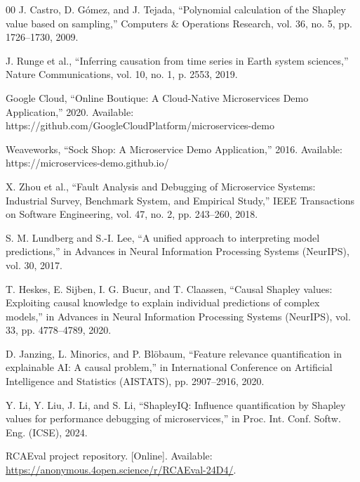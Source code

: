 \documentclass[conference]{IEEEtran}
\begin{document}
\begin{thebibliography}{00}
J. Castro, D. G\'{o}mez, and J. Tejada, ``Polynomial calculation of the Shapley value based on sampling,'' Computers \& Operations Research, vol. 36, no. 5, pp. 1726--1730, 2009.

J. Runge et al., ``Inferring causation from time series in Earth system sciences,'' Nature Communications, vol. 10, no. 1, p. 2553, 2019.

Google Cloud, ``Online Boutique: A Cloud-Native Microservices Demo Application,'' 2020. Available: https://github.com/GoogleCloudPlatform/microservices-demo

Weaveworks, ``Sock Shop: A Microservice Demo Application,'' 2016. Available: https://microservices-demo.github.io/

X. Zhou et al., ``Fault Analysis and Debugging of Microservice Systems: Industrial Survey, Benchmark System, and Empirical Study,'' IEEE Transactions on Software Engineering, vol. 47, no. 2, pp. 243--260, 2018.

S. M. Lundberg and S.-I. Lee, ``A unified approach to interpreting model predictions,'' in Advances in Neural Information Processing Systems (NeurIPS), vol. 30, 2017.

T. Heskes, E. Sijben, I. G. Bucur, and T. Claassen, ``Causal Shapley values: Exploiting causal knowledge to explain individual predictions of complex models,'' in Advances in Neural Information Processing Systems (NeurIPS), vol. 33, pp. 4778--4789, 2020.

D. Janzing, L. Minorics, and P. Blöbaum, ``Feature relevance quantification in explainable AI: A causal problem,'' in International Conference on Artificial Intelligence and Statistics (AISTATS), pp. 2907--2916, 2020.

Y. Li, Y. Liu, J. Li, and S. Li, ``ShapleyIQ: Influence quantification by Shapley values for performance debugging of microservices,'' in Proc. Int. Conf. Softw. Eng. (ICSE), 2024.

RCAEval project repository. [Online]. Available: \url{https://anonymous.4open.science/r/RCAEval-24D4/}.

\end{thebibliography}
\end{document}
